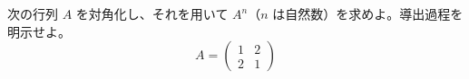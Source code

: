 
次の行列 $A$ を対角化し、それを用いて $A^{n}$（$n$ は自然数）を求めよ。導出過程を明示せよ。
\[
A = \begin{pmatrix} 1 & 2 \\ 2 & 1 \end{pmatrix}
\]
